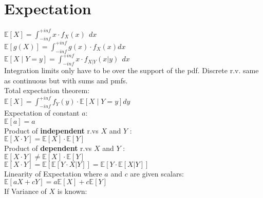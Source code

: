 \section{Expectation}

$\mathbb{E}\left[X\right]=\int_{-inf}^{+inf}{x \cdot f_X\left(x\right)\ \ dx}$\\

$\mathbb{E}\left[g\left(X\right)\right]=\int_{-inf}^{+inf}{g\left(x\right) \cdot f_X\left(x\right)dx}$\\

$\mathbb{E}\left[X\middle| Y=y\right]=\int_{-inf}^{+inf}{x \cdot { f}_{X|Y}\left(x|y\right)\ \ dx}$\\

Integration limits only have to be over the support of the pdf. Discrete r.v. same as continuous but with sums and pmfs.\\

Total expectation theorem:\\

$\mathbb{E}\left[X\right]=\int_{-inf}^{+inf}{f_Y\left(y\right)\cdot\mathbb{E}\left[X\middle| Y=y\right]dy}$\\

Expectation of constant $a$:\\

$\mathbb{E}[a] = a$\\

Product of \textbf{independent} r.vs $X$ and $Y$ :\\

$\mathbb{E}[X \cdot Y] = \mathbb{E}[X] \cdot \mathbb{E}[Y]$\\

Product of \textbf{dependent} r.vs $X$ and $Y$ :\\

$\mathbb{E}[X \cdot Y] \neq \mathbb{E}[X] \cdot \mathbb{E}[Y]$\\

$\mathbb{E}[X \cdot Y] = \mathbb{E}[\mathbb{E}[Y \cdot X|Y]] = \mathbb{E}[Y \cdot \mathbb{E}[X|Y]]$\\

Linearity of Expectation where $a$ and $c$ are given scalars:\\

$\mathbb{E}[aX + c Y] = a\mathbb{E}[X] + c\mathbb{E}[Y]$\\

If Variance of $X$ is known:\\

